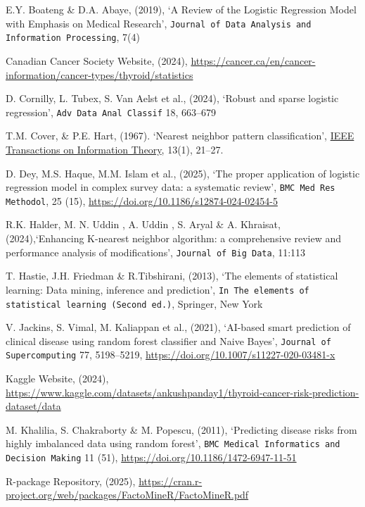 \documentclass[11pt,a4paper]{article}
\begin{document}
\begin{thebibliography}{9}

E.Y. Boateng \& D.A. Abaye, (2019), `A Review of the Logistic Regression Model with Emphasis on Medical Research', \texttt{Journal of Data Analysis and Information Processing}, 7(4)

Canadian Cancer Society Website, (2024), \url{ https://cancer.ca/en/cancer-information/cancer-types/thyroid/statistics}

 D. Cornilly, L. Tubex, S. Van Aelst et al., (2024), `Robust and sparse logistic regression', \texttt{Adv Data Anal Classif} 18, 663–679

T.M. Cover, \& P.E. Hart, (1967). `Nearest neighbor pattern classification', \url{IEEE Transactions on Information Theory}, 13(1), 21–27.

D. Dey, M.S. Haque, M.M. Islam et al., (2025), `The proper application of logistic regression model in complex survey data: a systematic review', \texttt{BMC Med Res Methodol}, 25 (15), \url{https://doi.org/10.1186/s12874-024-02454-5}

R.K. Halder, M. N. Uddin , A. Uddin , S. Aryal \& A. Khraisat, (2024),`Enhancing K-nearest neighbor algorithm: a comprehensive review and performance analysis of modifications', \texttt{Journal of Big Data}, 11:113

T. Hastie, J.H. Friedman \& R.Tibshirani, (2013), `The elements of statistical learning: Data mining, inference and prediction', \texttt{In The elements of statistical learning (Second ed.)}, Springer, New York

V. Jackins, S. Vimal, M. Kaliappan et al., (2021), `AI-based smart prediction of clinical disease using random forest classifier and Naive Bayes', \texttt{Journal of Supercomputing} 77, 5198–5219, \url{https://doi.org/10.1007/s11227-020-03481-x}

Kaggle Website, (2024), \url{https://www.kaggle.com/datasets/ankushpanday1/thyroid-cancer-risk-prediction-dataset/data}

M. Khalilia, S. Chakraborty \& M. Popescu, (2011), `Predicting disease risks from highly imbalanced data using random forest', \texttt{BMC Medical Informatics and Decision Making} 11 (51), \url{https://doi.org/10.1186/1472-6947-11-51}

R-package Repository, (2025), \url{https://cran.r-project.org/web/packages/FactoMineR/FactoMineR.pdf}


\end{thebibliography}
\end{document}
